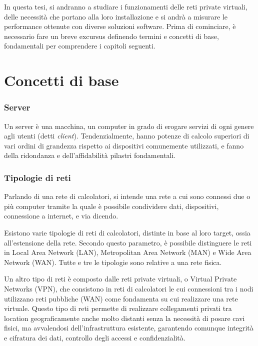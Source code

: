 
In questa tesi, si andranno a studiare i funzionamenti delle reti private virtuali, delle necessità che portano alla loro installazione e si andrà a misurare le performance ottenute con diverse soluzioni software.
Prima di cominciare, è necessario fare un breve excursus definendo termini e concetti di base, fondamentali per comprendere i capitoli seguenti.

\section{Concetti di base}
\subsubsection{Server}
Un server è una macchina, un computer in grado di erogare servizi di ogni genere agli utenti (detti \emph{client}). Tendenzialmente, hanno potenze di calcolo superiori di vari ordini di grandezza rispetto ai dispositivi comunemente utilizzati, e fanno della ridondanza e dell'affidabilità pilastri fondamentali.

\subsubsection{Tipologie di reti}
Parlando di una rete di calcolatori, si intende una rete a cui sono connessi due o più computer tramite la quale è possibile condividere dati, dispositivi, connessione a internet, e via dicendo.

Esistono varie tipologie di reti di calcolatori, distinte in base al loro target, ossia all'estensione della rete.
Secondo questo parametro, è possibile distinguere le reti in Local Area Network (LAN), Metropolitan Area Network (MAN) e Wide Area Network (WAN). Tutte e tre le tipologie sono relative a una rete fisica.

Un altro tipo di reti è composto dalle reti private virtuali, o Virtual Private Networks (VPN), che consistono in reti di calcolatori le cui connessioni tra i nodi utilizzano reti pubbliche (WAN) come fondamenta su cui realizzare una rete virtuale.
Questo tipo di reti permette di realizzare collegamenti privati tra location geograficamente anche molto distanti senza la necessità di posare cavi fisici, ma avvalendosi dell'infrastruttura esistente, garantendo comunque integrità e cifratura dei dati, controllo degli accessi e confidenzialità.

